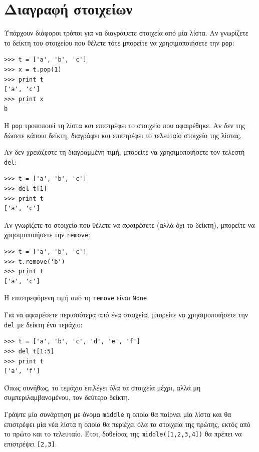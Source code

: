 \documentclass[10pt]{book}
\begin{document}
\section{Διαγραφή στοιχείων}

Υπάρχουν διάφοροι τρόποι για να διαγράψετε στοιχεία από μία λίστα. Αν γνωρίζετε το δείκτη του στοιχείου που θέλετε τότε μπορείτε να χρησιμοποιήσετε την {\tt pop}:

\begin{verbatim}
>>> t = ['a', 'b', 'c']
>>> x = t.pop(1)
>>> print t
['a', 'c']
>>> print x
b
\end{verbatim}
%

Η {\tt pop} τροποποιεί τη λίστα και επιστρέφει το στοιχείο που αφαιρέθηκε.
Αν δεν της δώσετε κάποιο δείκτη, διαγράφει και επιστρέφει το τελευταίο στοιχείο της λίστας.

Αν δεν χρειάζεστε τη διαγραμμένη τιμή, μπορείτε να χρησιμοποιήσετε τον τελεστή {\tt del}:

\begin{verbatim}
>>> t = ['a', 'b', 'c']
>>> del t[1]
>>> print t
['a', 'c']
\end{verbatim}
%

Αν γνωρίζετε το στοιχείο που θέλετε να αφαιρέσετε (αλλά όχι το δείκτη), μπορείτε να χρησιμοποιήσετε την {\tt remove}:

\begin{verbatim}
>>> t = ['a', 'b', 'c']
>>> t.remove('b')
>>> print t
['a', 'c']
\end{verbatim}
%

Η επιστρεφόμενη τιμή από τη {\tt remove} είναι {\tt None}.

Για να αφαιρέσετε περισσότερα από ένα στοιχεία, μπορείτε να χρησιμοποιήσετε την  {\tt del} με δείκτη ένα τεμάχιο:

\begin{verbatim}
>>> t = ['a', 'b', 'c', 'd', 'e', 'f']
>>> del t[1:5]
>>> print t
['a', 'f']
\end{verbatim}
%

Όπως συνήθως, το τεμάχιο επιλέγει όλα τα στοιχεία μέχρι, αλλά μη συμπεριλαμβανομένου, τον δεύτερο δείκτη.
\\
\begin{exercise}

Γράψτε μία συνάρτηση με όνομα \verb"middle" η οποία θα παίρνει μία λίστα και θα επιστρέφει μία νέα λίστα η οποία θα περιέχει όλα τα στοιχεία της πρώτης, εκτός από το πρώτο και το τελευταίο. Έτσι, δοθείσας της \verb"middle([1,2,3,4])" θα πρέπει να επιστρέψει \verb"[2,3]".
\\
\end{exercise}
\end{document}
